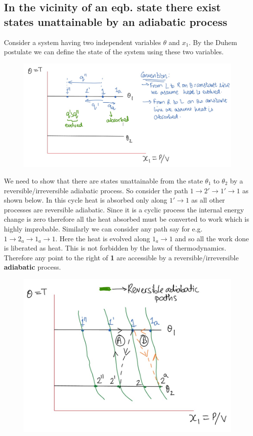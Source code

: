 \documentclass[12pt]{article}
\begin{document}
\subsection{In the vicinity of an eqb. state there exist states unattainable by an adiabatic process} \label{Caratheo2}
Consider a system having two independent variables $\theta$ and $x_1$. By the Duhem postulate we can define the state of the system using these two variables. 

\begin{figure}[h]
	\includegraphics[scale=0.6]{caratheodary1.jpg}
	\centering
	
\end{figure}
We need to show that there are states unattainable from the state $\theta_1$ to $\theta_2$ by a reversible/irreversible adiabatic process. So consider the path $1\to 2'\to 1'\to 1$ as shown below. In this cycle heat is absorbed only along $1'\to 1$ as all other processes are reversible adiabatic. Since it is a cyclic process the internal energy change is zero therefore all the heat absorbed must be converted to work which is highly improbable. Similarly we can consider any path say for e.g. $1\to 2_a\to 1_a\to 1 $. Here the heat is evolved along $1_a\to 1$ and so all the work done is liberated as heat. This is not forbidden by the laws of thermodynamics. Therefore any point to the right of \textbf{1} are accessible by a reversible/irreversible \textbf{adiabatic} process. \\

\begin{figure}[h]
	\includegraphics[scale=0.6]{caratheodary2..jpg}
	\centering
\end{figure}
\end{document}
